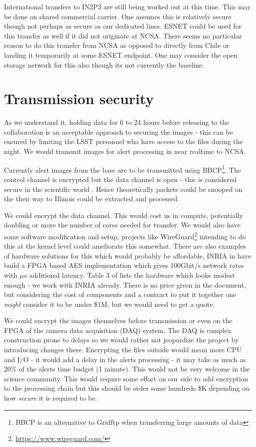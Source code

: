 International transfers to IN2P3 are still being worked out at this time. This may be done on shared commercial carrier. One assumes
this is relatively secure though not perhaps as secure as our dedicated lines. ESNET could be used for this transfer as well if it did not originate at NCSA. There seems no particular reason to do this transfer from NCSA as opposed to directly from Chile or landing it
temporarily at some ESNET endpoint. One may consider the open storage network \citep{osn} for this also though its not currently the baseline.


\section{Transmission security} \label{sec:trans}

As we understand it, holding data for 6 to 24 hours before releasing to the collaboration is an acceptable approach to securing the images - this can be ensured by limiting the LSST personnel who have access to the files during the night.
We would transmit images for alert processing in near realtime to NCSA.

Currently alert images from the base are to be transmitted using BBCP\footnote{BBCP is an alternative to Gridftp when transferring large amounts of data}. The control channel is encrypted but the data channel is open - this is considered secure in the scientific world \citep{bbcp}. Hence theoretically packets could be snooped on the their way to Illinois could be extracted and processed.


We could encrypt the data  channel. This would cost us in  compute, potentially  doubling or more the number of cores needed for transfer. We would also have some software modification and setup, projects like WireGuard\footnote{\url{https://www.wireguard.com/}} intending to do this at the kernel level could ameliorate this somewhat.
There are also  examples of hardware solutions for this which would probably be affordable, INRIA in \cite{10.1007/978-3-642-45073-0_1} have build a FPGA based AES\cite{aes} implementation  which gives 100Gbit/s network rates with $\mu s$ additional latency. Table 3 of \cite{10.1007/978-3-642-45073-0_1} lists the hardware which looks modest enough - we work with INRIA already. There is no price given in the document, but considering the cost of components and a contract to put it together one \emph{might} consider it to be  under \$1M, but we would need to get a quote.

We could encrypt the images themselves before transmission or even on the FPGA of the camera data acquisition (DAQ) system.  The DAQ is complex construction prone to delays so we would rather not jeopardize the project by introducing changes there. Encrypting the files outside would mean more CPU and I/O - it would add a delay in the alerts processing - it may take as much as 20\% of the alerts time budget (1 minute).  This would not be very welcome in the science community. This would require some effort on our side to add encryption to the processing chain but this should be order some hundreds \$K depending on how \emph{secure} it is required to be.




